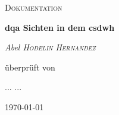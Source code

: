 \begin{titlepage}
	\thispagestyle{firstpage}
	
	\centering
	\vspace*{5cm}
	{\scshape\LARGE Dokumentation\par}
	\vspace{1.5cm}
	{\huge \bfseries \acs{dqa} Sichten in dem \acs{csdwh}\par}
	\vspace{2cm}
	{\Large \itshape Abel \textsc{Hodelin Hernandez}\par} 
	\vspace{2cm}
	überprüft von\par
	... \textsc{...}
	\vfill
	
	{\large \today\par}
\end{titlepage}